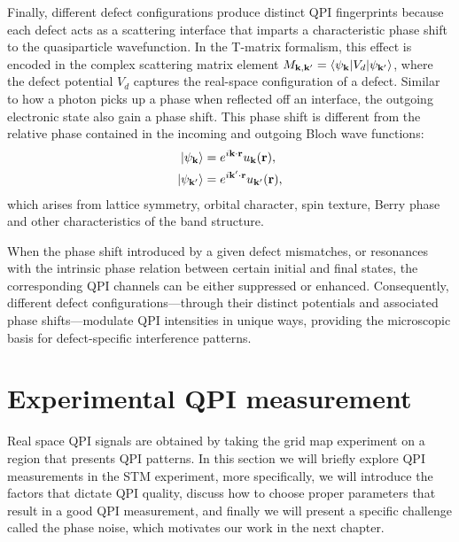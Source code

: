 
Finally, different defect configurations produce distinct \ac{QPI} fingerprints because each defect acts as a scattering interface that imparts a characteristic phase shift to the quasiparticle wavefunction. In the T-matrix formalism, this effect is encoded in the complex scattering matrix element $M_{\mathbf{k,k'}}= \braket{\psi_\mathbf{k}|V_d|\psi_\mathbf{k'}}$, where the defect potential $V_d$ captures the real-space configuration of a defect. Similar to how a photon picks up a phase when reflected off an interface, the outgoing electronic state also gain a phase shift. 
This phase shift is different from the relative phase contained in the incoming and outgoing Bloch wave functions:
\begin{align}
	\ket{\psi_{\mathbf{k}}} &= e^{i\mathbf{k}\cdot \mathbf{r}} u_{\mathbf{k}}(\mathbf{r}),\\
	\ket{\psi_{\mathbf{k'}}} &= e^{i\mathbf{k'}\cdot \mathbf{r}} u_{\mathbf{k'}}(\mathbf{r}),
\end{align}
which arises from lattice symmetry, orbital character, spin texture, Berry phase and other characteristics of the band structure. 

When the phase shift introduced by a given defect mismatches, or resonances with the intrinsic phase relation between certain initial and final states, the corresponding QPI channels can be either suppressed or enhanced. Consequently, different defect configurations—through their distinct potentials and associated phase shifts—modulate QPI intensities in unique ways, providing the microscopic basis for defect-specific interference patterns.

\section{Experimental QPI measurement}
Real space \ac{QPI} signals are obtained by taking the grid map experiment on a region that presents \ac{QPI} patterns. In this section we will briefly explore \ac{QPI} measurements in the \ac{STM} experiment, more specifically, we will introduce the factors that dictate \ac{QPI} quality, discuss how to choose proper parameters that result in a good \ac{QPI} measurement, and finally we will present a specific challenge called the phase noise, which motivates our work in the next chapter.


